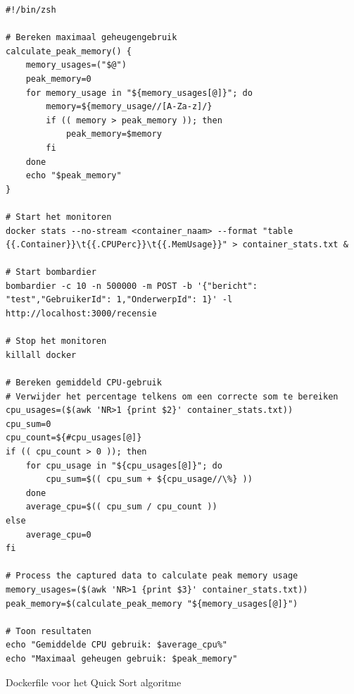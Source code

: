 \begin{listing}[H]
  \centering
  \begin{verbatim}
#!/bin/zsh

# Bereken maximaal geheugengebruik
calculate_peak_memory() {
    memory_usages=("$@")
    peak_memory=0
    for memory_usage in "${memory_usages[@]}"; do
        memory=${memory_usage//[A-Za-z]/}
        if (( memory > peak_memory )); then
            peak_memory=$memory
        fi
    done
    echo "$peak_memory"
}

# Start het monitoren
docker stats --no-stream <container_naam> --format "table {{.Container}}\t{{.CPUPerc}}\t{{.MemUsage}}" > container_stats.txt &

# Start bombardier
bombardier -c 10 -n 500000 -m POST -b '{"bericht": "test","GebruikerId": 1,"OnderwerpId": 1}' -l http://localhost:3000/recensie

# Stop het monitoren
killall docker

# Bereken gemiddeld CPU-gebruik
# Verwijder het percentage telkens om een correcte som te bereiken
cpu_usages=($(awk 'NR>1 {print $2}' container_stats.txt))
cpu_sum=0
cpu_count=${#cpu_usages[@]}
if (( cpu_count > 0 )); then
    for cpu_usage in "${cpu_usages[@]}"; do
        cpu_sum=$(( cpu_sum + ${cpu_usage//\%} ))
    done
    average_cpu=$(( cpu_sum / cpu_count ))
else
    average_cpu=0
fi

# Process the captured data to calculate peak memory usage
memory_usages=($(awk 'NR>1 {print $3}' container_stats.txt))
peak_memory=$(calculate_peak_memory "${memory_usages[@]}")

# Toon resultaten
echo "Gemiddelde CPU gebruik: $average_cpu%"
echo "Maximaal geheugen gebruik: $peak_memory"

      \end{verbatim}
      \caption{\label{code:zshscript}Dockerfile voor het Quick Sort algoritme}
\end{listing}

